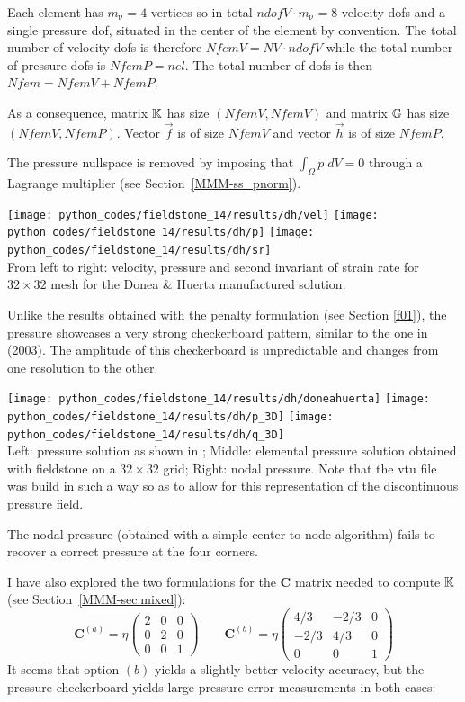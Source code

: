 Each element has $m_\upnu=4$ vertices so in total $ndofV\cdot m_\upnu=8$ 
velocity dofs and a single 
pressure dof, situated in the center of the element by convention. The total number of 
velocity dofs is therefore $NfemV=NV \cdot ndofV$ while the total number of
pressure dofs is $NfemP=nel$. The total number of dofs is then $Nfem=NfemV+NfemP$.

As a consequence, matrix ${\mathbb{K}}$ has size $(NfemV,NfemV)$ and matrix ${\mathbb{G}}$ has size $(NfemV,NfemP)$.
Vector $\vec{f}$ is of size $NfemV$ and vector $\vec{h}$ is of size $NfemP$.  

The pressure nullspace is removed by imposing that $\int_\Omega p \; dV =0$ through 
a Lagrange multiplier (see Section~\ref{MMM-ss_pnorm}).

\begin{center}
\texttt{[image: python\_codes/fieldstone\_14/results/dh/vel]}
\texttt{[image: python\_codes/fieldstone\_14/results/dh/p]}
\texttt{[image: python\_codes/fieldstone\_14/results/dh/sr]}\\
{\captionfont From left to right: velocity, pressure and second invariant 
of strain rate for $32\times 32$ mesh for the Donea \& Huerta manufactured solution.}
\end{center}

Unlike the results obtained with the penalty formulation (see Section \ref{f01}),
the pressure showcases a very strong checkerboard pattern, similar to the one 
in \textcite{dohu03} (2003). The amplitude of this checkerboard is unpredictable 
and changes from one resolution to the other.

\begin{center}
\texttt{[image: python\_codes/fieldstone\_14/results/dh/doneahuerta]}
\texttt{[image: python\_codes/fieldstone\_14/results/dh/p\_3D]}
\texttt{[image: python\_codes/fieldstone\_14/results/dh/q\_3D]}\\
{\captionfont Left: pressure solution as shown in \cite{dohu03}; Middle: elemental 
pressure solution obtained with fieldstone on a $32\times 32$ grid; 
Right: nodal pressure. 
Note that the vtu file was build in such a way so as to allow for 
this representation of the discontinuous pressure field.}
\end{center}

The nodal pressure (obtained with a simple center-to-node algorithm)
fails to recover a correct pressure at the four corners.

I have also explored the two formulations for the ${\bm C}$ matrix needed to 
compute ${\mathbb{K}}$ (see Section~\ref{MMM-sec:mixed}):
\[
{\bm C}^{(a)}= \eta 
\left(
\begin{array}{ccc}
2 & 0 & 0 \\
0 & 2 & 0 \\
0 & 0 & 1
\end{array}
\right)
\qquad
{\bm C}^{(b)}= \eta
\left(
\begin{array}{ccc}
4/3 & -2/3 & 0 \\
-2/3 & 4/3 & 0 \\
0 & 0 & 1
\end{array}
\right)
\]
It seems that option $(b)$ yields a slightly better velocity accuracy, but the pressure 
checkerboard yields large pressure error measurements in both cases:

